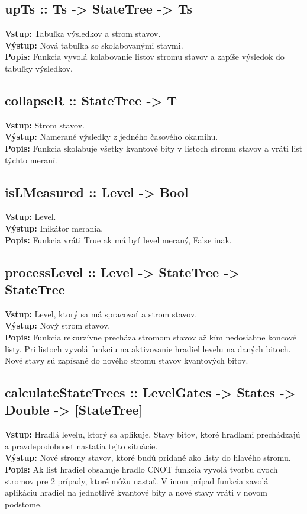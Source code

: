 \subsection*{upTs :: Ts -> StateTree -> Ts}
\textbf{Vstup:} Tabuľka výsledkov a strom stavov.\\
\textbf{Výstup:} Nová tabuľka so skolabovanými stavmi.\\
\textbf{Popis:} Funkcia vyvolá kolabovanie listov stromu stavov a zapíše 
výsledok do tabuľky výsledkov.

\subsection*{collapseR :: StateTree -> T}
\textbf{Vstup:} Strom stavov.\\
\textbf{Výstup:} Namerané výsledky z jedného časového okamihu.\\
\textbf{Popis:} Funkcia skolabuje všetky kvantové bity v listoch stromu 
stavov a vráti list týchto meraní.

\subsection*{isLMeasured :: Level -> Bool}
\textbf{Vstup:} Level.\\
\textbf{Výstup:} Inikátor merania.\\
\textbf{Popis:} Funkcia vráti True ak má byť level meraný, False inak.

\subsection*{processLevel :: Level -> StateTree -> StateTree}
\textbf{Vstup:} Level, ktorý sa má spracovať a strom stavov.\\
\textbf{Výstup:} Nový strom stavov.\\
\textbf{Popis:} Funkcia rekurzívne precháza stromom stavov až kím nedosiahne
koncové listy. Pri listoch vyvolá funkciu na aktivovanie hradiel levelu na 
daných bitoch. Nové stavy sú zapísané do nového stromu stavov kvantových bitov.

\subsection*{calculateStateTrees ::  LevelGates -> States -> Double -> [StateTree]}
\textbf{Vstup:} Hradlá levelu, ktorý sa aplikuje, Stavy bitov, ktoré hradlami
prechádzajú a pravdepodobnosť nastatia tejto situácie.\\
\textbf{Výstup:} Nové stromy stavov, ktoré budú pridané ako listy do hlavého
stromu.\\
\textbf{Popis:} Ak list hradiel obsahuje hradlo CNOT funkcia vyvolá tvorbu
dvoch stromov pre 2 prípady, ktoré môžu nastať. V inom prípad funkcia zavolá
aplikáciu hradiel na jednotlivé kvantové bity a nové stavy vráti v novom 
podstome.

